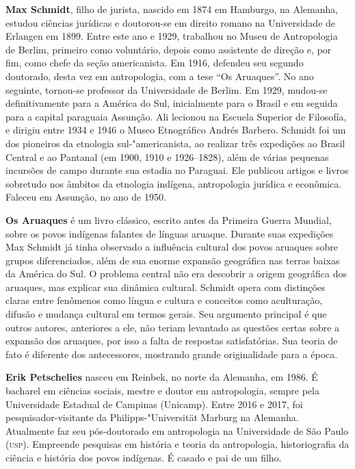 \textbf{Max Schmidt}, filho de jurista, nascido em 1874 em Hamburgo, na Alemanha, estudou ciências jurídicas e doutorou-se em direito romano na Universidade de Erlangen em 1899. Entre este ano e 1929, trabalhou no Museu de Antropologia de Berlim, primeiro como voluntário, depois como assistente de direção e, por fim, como chefe da seção americanista. Em 1916, defendeu seu segundo doutorado, desta vez em antropologia, com a tese ``Os Aruaques''. No ano seguinte, tornou-se professor da Universidade de Berlim. Em 1929, mudou-se definitivamente para a América do Sul, inicialmente para o Brasil e em seguida para a capital paraguaia Assunção. Ali lecionou na Escuela Superior de Filosofía, e dirigiu entre 1934 e 1946 o Museo Etnográfico Andrés Barbero. Schmidt foi um dos pioneiros da etnologia sul-"americanista, ao realizar três expedições ao Brasil Central e ao Pantanal (em 1900, 1910 e 1926--1828), além de várias pequenas incursões de campo durante sua estadia no Paraguai. Ele publicou artigos e livros sobretudo nos âmbitos da etnologia indígena, antropologia jurídica e econômica. Faleceu em Assunção, no ano de 1950.

\textbf{Os Aruaques} é um livro clássico, escrito antes da Primeira Guerra Mundial, sobre os povos indígenas falantes de línguas aruaque. Durante suas expedições Max Schmidt já tinha observado a influência cultural dos povos aruaques sobre grupos diferenciados, além de sua enorme expansão geográfica nas terras baixas da América do Sul. O problema central não era descobrir a origem geográfica dos aruaques, mas explicar sua dinâmica cultural. Schmidt opera com distinções claras entre fenômenos como língua e cultura e conceitos como aculturação, difusão e mudança cultural em termos gerais. Seu argumento principal é que outros autores, anteriores a ele, não teriam levantado as questões certas sobre a expansão dos aruaques, por isso a falta de respostas satisfatórias. Sua teoria de fato é diferente dos antecessores, mostrando grande originalidade para a época.

\textbf{Erik Petschelies} nasceu em Reinbek, no norte da Alemanha, em 1986. É bacharel em ciências sociais, mestre e doutor em antropologia, sempre pela Universidade Estadual de Campinas (Unicamp). Entre 2016 e 2017, foi pesquisador-visitante da Philipps-"Universität Marburg na Alemanha. Atualmente faz seu pós-doutorado em antropologia na Universidade de São Paulo (\textsc{usp}). Empreende pesquisas em história e teoria da antropologia, historiografia da ciência e história dos povos indígenas. É casado e pai de um filho.

